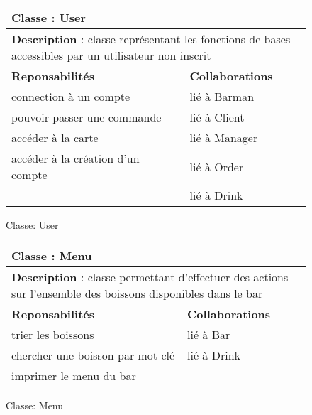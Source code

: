 \documentclass{article}
\begin{document}
\begin{figure}
\begin{tabular}{|p{7cm}|p{7cm}|}
\hline
 \multicolumn{2}{|p{12cm}|}{\textbf{Classe} : User }
   \\
 \hline
  \multicolumn{2}{|p{12cm}|}{ \textbf{Description} :  classe représentant les fonctions de bases accessibles par un utilisateur non inscrit }
\\
 \hline
 \textbf{Reponsabilités} & \textbf{Collaborations} \\
 \hline
connection à un compte & lié à Barman\\
pouvoir passer une commande & lié à Client \\
accéder à la carte & lié à Manager \\
accéder à la création d'un compte & lié à Order \\
 & lié à Drink \\


  \hline
\end{tabular}
\caption{Classe: User}
\label{tab:user}
\end{figure}


\begin{figure}
\begin{tabular}{|p{7cm}|p{7cm}|}
\hline
 \multicolumn{2}{|p{12cm}|}{\textbf{Classe} : Menu }
   \\
 \hline
  \multicolumn{2}{|p{12cm}|}{ \textbf{Description} :  classe permettant d'effectuer des actions sur l'ensemble des boissons disponibles dans le bar }
\\
 \hline
 \textbf{Reponsabilités} & \textbf{Collaborations} \\
 \hline
trier les boissons & lié à Bar\\
chercher une boisson par mot clé & lié à Drink \\
imprimer le menu du bar & \\

  \hline
\end{tabular}
\caption{Classe: Menu}
\label{tab:user}
\end{figure}
\end{document}
